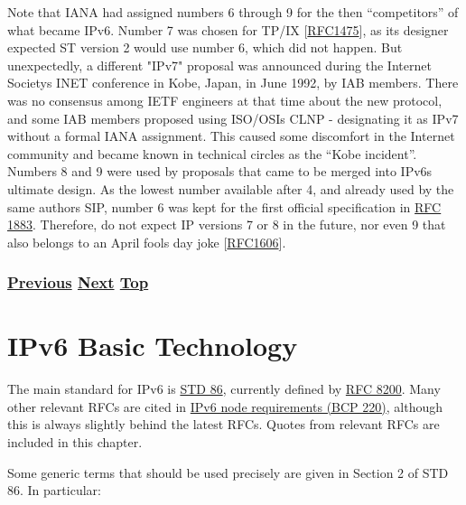 \documentclass[
]{article}
\begin{document}
Note that IANA had assigned numbers 6 through 9 for the then
``competitors'' of what became IPv6. Number 7 was chosen for TP/IX
{[}\href{https://www.rfc-editor.org/info/rfc1475}{RFC1475}{]}, as its
designer expected ST version 2 would use number 6, which did not happen.
But unexpectedly, a different "IPv7" proposal was announced during the
Internet Society\textquotesingle s INET conference in Kobe, Japan, in
June 1992, by IAB members. There was no consensus among IETF engineers
at that time about the new protocol, and some IAB members proposed using
ISO/OSI\textquotesingle s CLNP - designating it as IPv7 without a formal
IANA assignment. This caused some discomfort in the Internet community
and became known in technical circles as the ``Kobe incident''. Numbers
8 and 9 were used by proposals that came to be merged into
IPv6\textquotesingle s ultimate design. As the lowest number available
after 4, and already used by the same author\textquotesingle s SIP,
number 6 was kept for the first official specification in
\href{https://www.rfc-editor.org/info/rfc1883}{RFC 1883}. Therefore, do
not expect IP versions 7 or 8 in the future, nor even 9 that also
belongs to an April fool\textquotesingle s day joke
{[}\href{https://www.rfc-editor.org/info/rfc1606}{RFC1606}{]}.

\subsubsection{\texorpdfstring{\hyperref[acknowledgments]{Previous}
\hyperref[ipv6-basic-technology]{Next}
\hyperref[introduction-and-foreword]{Top}}{Previous Next Top}}\label{previous-next-top-7}

\pagebreak

\section{IPv6 Basic Technology}\label{ipv6-basic-technology}

The main standard for IPv6 is
\href{https://www.rfc-editor.org/info/std86}{STD 86}, currently defined
by \href{https://www.rfc-editor.org/info/rfc8200}{RFC 8200}. Many other
relevant RFCs are cited in
\href{https://www.rfc-editor.org/info/bcp220}{IPv6 node requirements
(BCP 220)}, although this is always slightly behind the latest RFCs.
Quotes from relevant RFCs are included in this chapter.

Some generic terms that should be used precisely are given in Section 2
of STD 86. In particular:
\end{document}
